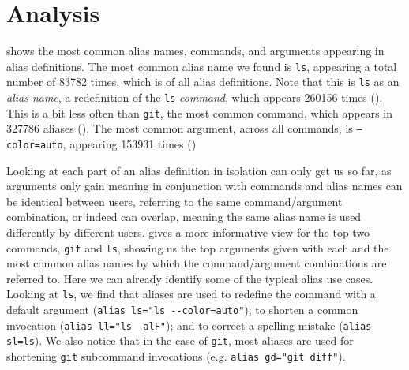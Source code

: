 \section{Analysis}



 shows the most common alias names, commands, and arguments appearing in alias definitions.
The most common alias name we found is \texttt{ls}, appearing a total number of \num{83782} times, which is  of all alias definitions.
Note that this is \texttt{ls} as an \emph{alias name}, a redefinition of the \texttt{ls} \emph{command}, which appears \num{260156} times ().
This is a bit less often than \texttt{git}, the most common command, which appears in \num{327786} aliases ().
The most common argument, across all commands, is \texttt{--color=auto}, appearing \num{153931} times ()



Looking at each part of an alias definition in isolation can only get us so far, as arguments only gain meaning in conjunction with commands and alias names can be identical between users, referring to the same command/argument combination, or indeed can overlap, meaning the same alias name is used differently by different users.
 gives a more informative view for the top two commands, \texttt{git} and \texttt{ls}, showing us the top arguments given with each and the most common alias names by which the command/argument combinations are referred to.
Here we can already identify some of the typical alias use cases.
Looking at \texttt{ls}, we find that aliases are used
to redefine the command with a default argument (\verb|alias ls="ls --color=auto"|);
to shorten a common invocation (\verb|alias ll="ls -alF"|);
and to correct a spelling mistake (\verb|alias sl=ls|).
We also notice that in the case of \texttt{git}, most aliases are used for shortening \texttt{git} subcommand invocations (e.g. \verb|alias gd="git diff"|).


